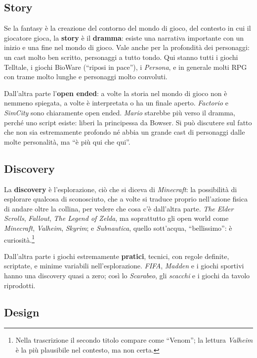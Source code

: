 \subsection{Story}

Se la fantasy è la creazione del contorno del mondo di gioco, del contesto in
cui il giocatore gioca, la \textbf{story} è il \textbf{dramma}: esiste una
narrativa importante con un inizio e una fine nel mondo di gioco. Vale anche
per la profondità dei personaggi: un cast molto ben scritto, personaggi a
tutto tondo. Qui stanno tutti i giochi Telltale, i giochi BioWare (``riposi in
pace''), i \emph{Persona}, e in generale molti RPG con trame molto lunghe e
personaggi molto convoluti.

Dall'altra parte l'\textbf{open ended}: a volte la storia nel mondo di gioco
non è nemmeno spiegata, a volte è interpretata o ha un finale aperto.
\emph{Factorio} e \emph{SimCity} sono chiaramente open ended. \emph{Mario}
starebbe più verso il dramma, perché uno script esiste: liberi la principessa
da Bowser. Si può discutere sul fatto che non sia estremamente profondo né
abbia un grande cast di personaggi dalle molte personalità, ma ``è più qui
che qui''.

\subsection{Discovery}

La \textbf{discovery} è l'esplorazione, ciò che si diceva di
\emph{Minecraft}: la possibilità di esplorare qualcosa di sconosciuto, che a
volte si traduce proprio nell'azione fisica di andare oltre la collina, per
vedere che cosa c'è dall'altra parte. \emph{The Elder Scrolls}, \emph{Fallout},
\emph{The Legend of Zelda}, ma soprattutto gli open world come
\emph{Minecraft}, \emph{Valheim}, \emph{Skyrim}; e \emph{Subnautica}, quello
sott'acqua, ``bellissimo'': è curiosità.\footnote{Nella trascrizione il
secondo titolo compare come ``Venom''; la lettura \emph{Valheim} è la più
plausibile nel contesto, ma non certa.}

Dall'altra parte i giochi estremamente \textbf{pratici}, tecnici, con regole
definite, scriptate, e minime variabili nell'esplorazione. \emph{FIFA},
\emph{Madden} e i giochi sportivi hanno una discovery quasi a zero; così lo
\emph{Scarabeo}, gli \emph{scacchi} e i giochi da tavolo riprodotti.

\subsection{Design}

